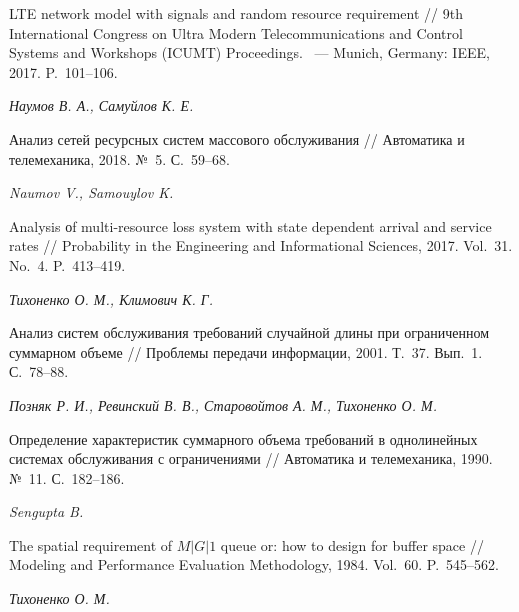 \documentclass[a4paper,12pt]{article}
\begin{document}
\begin{enumerate}
LTE network model with signals and random resource requirement // {9th International Congress on Ultra Modern Telecommunications and Control Systems and Workshops (ICUMT) Proceedings}. ~--- Munich, Germany: IEEE, 2017. P.~101--106.





\textit{Наумов В. А., Самуйлов К. Е.}

Анализ сетей ресурсных систем массового обслуживания // {Автоматика и телемеханика}, 2018. №~5. С.~59--68.





\textit{Naumov V., Samouylov K.}

Analysis оf multi-resource loss system with state dependent arrival and service rates // {Probability in the Engineering and Informational Sciences}, 2017. Vol.~31. No.~4. P.~413--419.





\textit{Тихоненко О. М., Климович К. Г.}

Анализ систем обслуживания требований случайной длины при ограниченном суммарном объеме // {Проблемы передачи информации}, 2001. Т.~37. Вып.~1. С.~78--88.





\textit{Позняк Р. И., Ревинский В. В., Старовойтов А. М., Тихоненко О. М.}

Определение характеристик суммарного объема требований в однолинейных системах обслуживания с ограничениями // {Автоматика и телемеханика}, 1990. №~11. С.~182--186.





\textit{Sengupta B.}

The spatial requirement of $M|G|1$ queue or: how to design for buffer space // {Modeling and Performance Evaluation Methodology}, 1984. Vol.~60. P.~545--562.





\textit{Тихоненко О. М.}


\end{enumerate}
\end{document}

